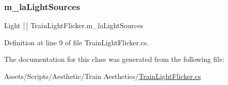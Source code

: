 \subsubsection{\texorpdfstring{m\+\_\+la\+Light\+Sources}{m\_laLightSources}}
{\footnotesize\ttfamily Light \mbox{[}$\,$\mbox{]} Train\+Light\+Flicker.\+m\+\_\+la\+Light\+Sources}



Definition at line 9 of file Train\+Light\+Flicker.\+cs.



The documentation for this class was generated from the following file\+:\begin{DoxyCompactItemize}
\item 
Assets/\+Scripts/\+Aesthetic/\+Train Aesthetics/\mbox{\hyperlink{_train_light_flicker_8cs}{Train\+Light\+Flicker.\+cs}}\end{DoxyCompactItemize}
